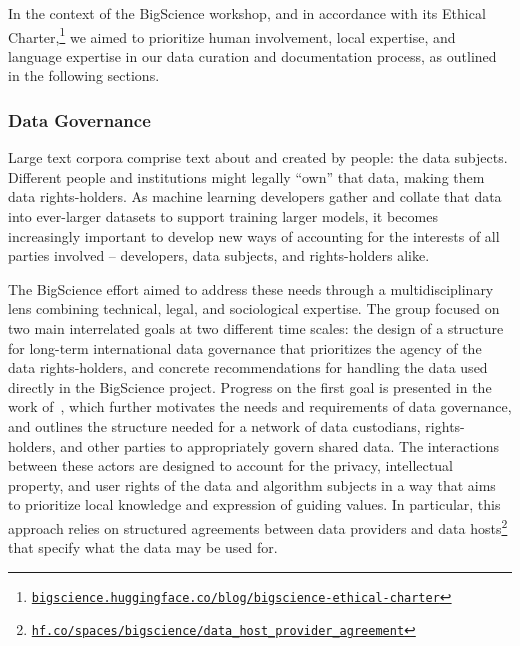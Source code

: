 \documentclass[twoside,11pt]{article}
\begin{document}
In the context of the BigScience workshop, and in accordance with its Ethical Charter,\footnote{\href{https://bigscience.huggingface.co/blog/bigscience-ethical-charter}{\texttt{bigscience.huggingface.co/blog/bigscience-ethical-charter}}} we aimed to prioritize human involvement, local expertise, and language expertise in our data curation and documentation process, as outlined in the following sections.

\subsubsection{Data Governance}

Large text corpora comprise text about and created by people: the data subjects. Different people and institutions might legally ``own'' that data, making them data rights-holders. As machine learning developers gather and collate that data into ever-larger datasets to support training larger models, it becomes increasingly important to develop new ways of accounting for the interests of all parties involved -- developers, data subjects, and rights-holders alike.
%

The BigScience effort aimed to address these needs through a multidisciplinary lens combining technical, legal, and sociological expertise.
The group focused on two main interrelated goals at two different time scales: the design of a structure for long-term international data governance that prioritizes the agency of the data rights-holders, and concrete recommendations for handling the data used directly in the BigScience project.
Progress on the first goal is presented in the work of~\citet{jernite2022data}, which further motivates the needs and requirements of data governance, and outlines the structure needed for a network of data custodians, rights-holders, and other parties to appropriately govern shared data.
The interactions between these actors are designed to account for the privacy, intellectual property, and user rights of the data and algorithm subjects in a way that aims to prioritize local knowledge and expression of guiding values.
In particular, this approach relies on structured agreements between data providers and data hosts\footnote{\href{https://hf.co/spaces/bigscience/data_host_provider_agreement}{\texttt{hf.co/spaces/bigscience/data\_host\_provider\_agreement}}} that specify what the data may be used for.
\end{document}
